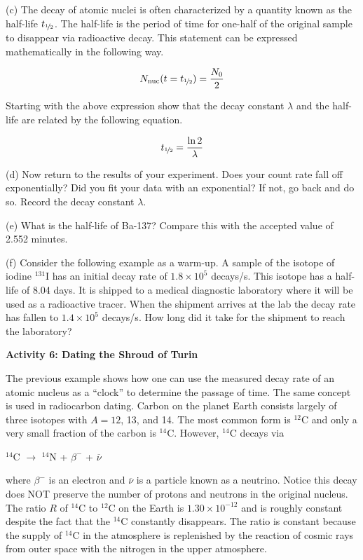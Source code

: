 \providecommand{\halflife}{t_{\rm \nicefrac{1\mkern-1mu}{\mkern-1mu2}}}

(c) The decay of atomic nuclei is often characterized by a quantity
known as the half-life \( \halflife  \). The half-life is the period of
time for one-half of the original sample to disappear via radioactive
decay. This statement can be expressed mathematically in the following
way.

\[
N_{\rm nuc}(t=\halflife)=\frac{N_{0}}{2}\]


Starting with the above expression show that the decay constant \( \lambda  \)
and the half-life are related by the following equation.

\[
\halflife = \frac{\ln 2}{\lambda }\]


\vspace{1.5in}

(d) Now return to the results of your experiment.
Does your count rate fall off exponentially?
Did you fit your data with an exponential? If not,
go back and do so.
Record the decay constant $\lambda$.
\answerspace{0.75in}

\pagebreak[2]
(e) What is the half-life of Ba-137? Compare this with the accepted value of 2.552 minutes.
\answerspace{1.5in}

(f) Consider the following example as a warm-up. A sample of the isotope of iodine
\( ^{131} \)I has an initial decay rate of $1.8 \times 10^{5}$ decays/s.
This isotope has a half-life of 8.04 days. It is shipped to a medical
diagnostic laboratory where it will be used as a radioactive tracer.
When the shipment arrives at the lab the decay rate has fallen to
$1.4 \times 10^{5}$ decays/s. How long did it take for the shipment
to reach the laboratory?
\vspace{2in}


\textbf{Activity 6: Dating the Shroud of Turin }

The previous example shows how one can use the measured decay rate
of an atomic nucleus as a {}``clock'' to determine the passage of
time. The same concept is used in radiocarbon dating. Carbon on the
planet Earth consists largely of three isotopes with $A = 12$, 13, and
14. The most common form is \( ^{12} \)C and only a very small fraction
of the carbon is \( ^{14} \)C. However, \( ^{14} \)C decays via 

{\centering \( ^{14} \)C \( \rightarrow  \) \( ^{14} \)N + \( \beta ^{-} \)
+ \( \overline{\nu } \)\par}

where \( \beta ^{-} \) is an electron and \( \overline{\nu } \)
is a particle known as a neutrino. Notice this decay does NOT preserve
the number of protons and neutrons in the original nucleus. The ratio
$R$ of \( ^{14} \)C to \( ^{12} \)C on the Earth is $1.30 \times 10^{-12}$
and is roughly constant despite the fact that the \( ^{14} \)C constantly
disappears. The ratio is constant because the supply of \( ^{14} \)C
in the atmosphere is replenished by the reaction of cosmic rays from
outer space with the nitrogen in the upper atmosphere.


